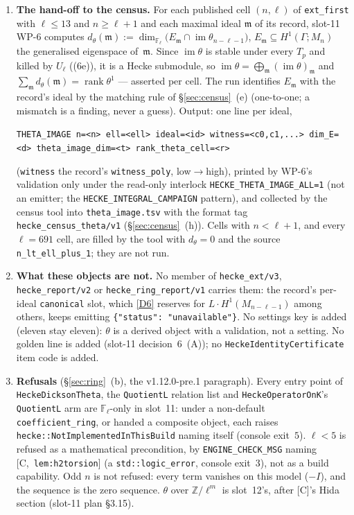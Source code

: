 \documentclass[11pt]{article}
\theoremstyle{remark}
\newcommand{\F}{\mathbb{F}}
\newcommand{\Z}{\mathbb{Z}}
\newcommand{\Ga}{\Gamma}
\newcommand{\Fl}{\F_\ell}
\DeclareMathOperator{\rank}{rank}
\DeclareMathOperator{\im}{im}
\newcommand{\m}{\mathfrak{m}}
\newcommand{\Mn}{M_n}
\newcommand{\HA}[1]{[C,~\texttt{#1}]}      %
\begin{document}
\begin{enumerate}[label=(\alph*)]
  committed before it is run (slot-11 rule~20), and each is compared against an independent object
  --- the label of $\Sigma(\ell)$ (\S\ref{sec:atlas}) and the $T_p$-eigenvalues for $p\le13$.
  Agreement and disagreement are both results; a disagreement is a finding, reported, never
  re-fitted.
\item \textbf{The hand-off to the census.} For each published cell $(n,\ell)$ of
  \texttt{ext\_first} with $\ell\le13$ and $n\ge\ell+1$ and each maximal ideal $\m$ of its record,
  slot-11 WP-6 computes $d_\theta(\m):=\dim_{\Fl}\big(E_\m\cap\im\theta_{n-\ell-1}\big)$, $E_\m\subseteq
  H^1(\Ga;\Mn)$ the generalised eigenspace of~$\m$. Since $\im\theta$ is stable under every $T_p$
  and killed by $U_\ell$ ((6e)), it is a Hecke submodule, so $\im\theta=\bigoplus_\m(\im\theta)_\m$ and
  $\sum_\m d_\theta(\m)=\rank\theta^1$ --- asserted per cell. The run identifies $E_\m$ with the
  record's ideal by the matching rule of \S\ref{sec:census}~(e) (one-to-one; a mismatch is a
  finding, never a guess). Output: one line per ideal,
  \begin{center}\footnotesize
  \texttt{THETA\_IMAGE n=<n> ell=<ell> ideal=<id> witness=<c0,c1,...> dim\_E=<d> theta\_image\_dim=<t> rank\_theta\_cell=<r>}
  \end{center}
  (\texttt{witness} the record's \texttt{witness\_poly}, low$\to$high), printed by WP-6's
  validation only under the read-only interlock \texttt{HECKE\_THETA\_IMAGE\_ALL=1} (not an
  emitter; the \texttt{HECKE\_INTEGRAL\_CAMPAIGN} pattern), and collected by the census tool into
  \texttt{theta\_image.tsv} with the format tag \texttt{hecke\_census\_theta/v1} (\S\ref{sec:census}~(h)).
  Cells with $n<\ell+1$, and every $\ell=691$ cell, are filled by the tool with $d_\theta=0$ and the
  source \texttt{n\_lt\_ell\_plus\_1}; they are not run.
\item \textbf{What these objects are not.} No member of \texttt{hecke\_ext/v3},
  \texttt{hecke\_report/v2} or \texttt{hecke\_ring\_report/v1} carries them: the record's per-ideal
  \texttt{canonical} slot, which \ref{D6} reserves for $L\cdot H^1(M_{n-\ell-1})$ among others,
  keeps emitting \texttt{\{"status": "unavailable"\}}. No settings key is added (eleven stay
  eleven): $\theta$ is a derived object with a validation, not a setting. No golden line is added
  (slot-11 decision~6~(A)); no \texttt{HeckeIdentityCertificate} item code is added.
\item \textbf{Refusals} (\S\ref{sec:ring}~(b), the v1.12.0-pre.1 paragraph). Every entry point of
  \texttt{HeckeDicksonTheta}, the \texttt{QuotientL} relation list and \texttt{HeckeOperatorOnK}'s
  \texttt{QuotientL} arm are $\Fl$-only in slot~11: under a non-default
  \texttt{coefficient\_ring}, or handed a composite object, each raises
  \texttt{hecke::NotImplementedInThisBuild} naming itself (console exit~$5$). $\ell<5$ is refused as
  a mathematical precondition, by \texttt{ENGINE\_CHECK\_MSG} naming \HA{lem:h2torsion} (a
  \texttt{std::logic\_error}, console exit~$3$), not as a build capability. Odd $n$ is not
  refused: every term vanishes on this model ($-I$), and the sequence is the zero sequence.
  $\theta$ over $\Z/\ell^m$ is slot~12's, after [C]'s Hida section (slot-11 plan \S3.15).
\end{enumerate}
\end{document}
